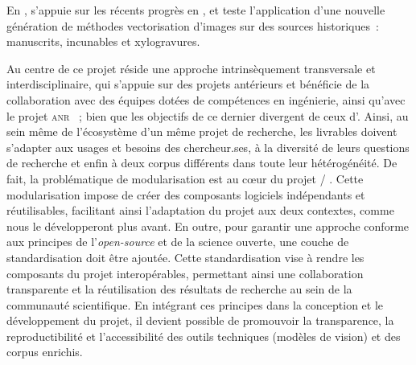 En \cv, \eida s'appuie sur les récents progrès en
\dl, et teste l'application d'une nouvelle génération de
méthodes vectorisation d'images sur des sources
historiques~: manuscrits, incunables et xylogravures.

Au centre de ce projet réside une approche intrinsèquement transversale
et interdisciplinaire, qui s'appuie sur des projets antérieurs et
bénéficie de la collaboration avec des équipes dotées de compétences en
ingénierie, ainsi qu'avec le projet \textsc{anr} \vhs~; bien que les objectifs de
ce dernier divergent de ceux d'\eida. Ainsi, au sein même de l'écosystème
d'un même projet de recherche, les livrables doivent s'adapter aux
usages et besoins des chercheur.ses, à la diversité de leurs questions de
recherche et enfin à deux corpus différents dans toute leur
hétérogénéité. De fait, la problématique de modularisation est au cœur
du projet \vhs / \eida. Cette modularisation impose de créer des composants
logiciels indépendants et réutilisables, facilitant ainsi l'adaptation
du projet aux deux contextes, comme nous le développeront plus avant. En
outre, pour garantir une approche conforme aux principes de l'\emph{open-source} et de la science ouverte, une couche de standardisation doit être
ajoutée. Cette standardisation vise à rendre les composants du projet
interopérables, permettant ainsi une collaboration transparente et la
réutilisation des résultats de recherche au sein de la communauté
scientifique. En intégrant ces principes dans la conception et le
développement du projet, il devient possible de promouvoir la
transparence, la reproductibilité et l'accessibilité des outils
techniques (modèles de vision) et des corpus enrichis.
